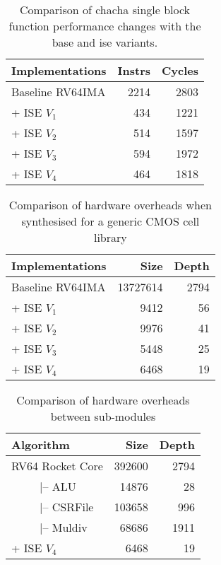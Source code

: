 
\begin{table}
\caption{Comparison of chacha single block function performance changes
with the base and ise variants.}
\label{tab:res:sw:perf}
\begin{tabular}{lrr}
\toprule            
Implementations      & Instrs   & Cycles \\

\midrule
Baseline RV64IMA     & 2214     & 2803   \\
           + ISE $V_1$ &  434     & 1221   \\
           + ISE $V_2$ &  514     & 1597   \\
           + ISE $V_3$ &  594     & 1972   \\
           + ISE $V_4$ &  464     & 1818   \\

\bottomrule
\end{tabular}
\end{table}


\begin{table}
\caption{Comparison of hardware overheads when synthesised for a
generic CMOS cell library}
\label{tab:res:sw:hardcost1}
\begin{tabular}{lrr}
\toprule            
Implementations      & Size         & Depth \\

\midrule
Baseline RV64IMA     & 13727614     & 2794   \\
           + ISE $V_1$ &     9412     & 56   \\
           + ISE $V_2$ &     9976     & 41   \\
           + ISE $V_3$ &     5448     & 25   \\
           + ISE $V_4$ &     6468     & 19   \\

\bottomrule
\end{tabular}
\end{table}

\begin{table}
\caption{Comparison of hardware overheads between sub-modules}
\label{tab:res:sw:hardcost2}
\begin{tabular}{lrr}
\toprule            
Algorithm        &     Size     & Depth  \\

\midrule
RV64 Rocket Core &   392600     & 2794  \\
~~~~~|-- ALU     &    14876     &   28  \\
~~~~~|-- CSRFile &   103658     &  996  \\
~~~~~|-- Muldiv  &    68686     & 1911  \\
+ ISE $V_4$        &     6468     &   19  \\ 

\bottomrule
\end{tabular}
\end{table}
